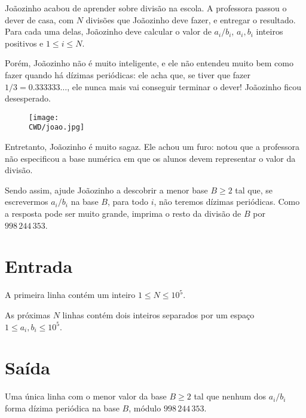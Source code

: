 %

Joãozinho acabou de aprender sobre divisão na escola. A professora passou o dever de casa, com $N$ divisões que Joãozinho deve fazer, e entregar o resultado. Para cada uma delas, Joãozinho deve calcular o valor de $a_i / b_i$, $a_i, b_i$ inteiros positivos e $1 \leq i \leq N$.

Porém, Joãozinho não é muito inteligente, e ele não entendeu muito bem como fazer quando há dízimas periódicas: ele acha que, se tiver que fazer $1 / 3 = 0.333333\dots$, ele nunca mais vai conseguir terminar o dever! Joãozinho ficou desesperado.
\begin{figure}[H]
    \centering
    \texttt{[image: \\CWD/joao.jpg]}
\end{figure}
Entretanto, Joãozinho é muito sagaz. Ele achou um furo: notou que a professora não especificou a base numérica em que os alunos devem representar o valor da divisão.

Sendo assim, ajude Joãozinho a descobrir a menor base $B \geq 2$ tal que, se escrevermos $a_i / b_i$ na base $B$, para todo $i$, não teremos dízimas periódicas. Como a resposta pode ser muito grande, imprima o resto da divisão de $B$ por $998\,244\,353$.

%
%

\section*{Entrada}

A primeira linha contém um inteiro $1 \leq N \leq 10^5$.

As próximas $N$ linhas contém dois inteiros separados por um espaço $1 \leq a_i, b_i \leq 10^5$.

%
%

\section*{Saída}

Uma única linha com o menor valor da base $B \geq 2$ tal que nenhum dos $a_i / b_i$ forma dízima periódica na base $B$, módulo $998\,244\,353$.

